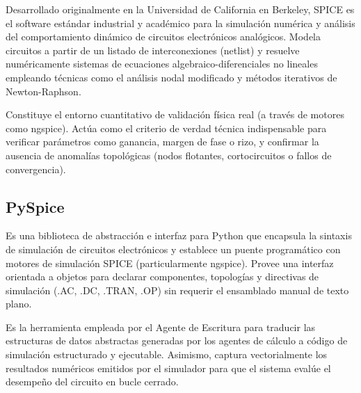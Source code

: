 Desarrollado originalmente en la Universidad de California en Berkeley, SPICE es el software estándar industrial y académico para la simulación numérica y análisis del comportamiento dinámico de circuitos electrónicos analógicos. Modela circuitos a partir de un listado de interconexiones (netlist) y resuelve numéricamente sistemas de ecuaciones algebraico-diferenciales no lineales empleando técnicas como el análisis nodal modificado y métodos iterativos de Newton-Raphson.

Constituye el entorno cuantitativo de validación física real (a través de motores como ngspice). Actúa como el criterio de verdad técnica indispensable para verificar parámetros como ganancia, margen de fase o rizo, y confirmar la ausencia de anomalías topológicas (nodos flotantes, cortocircuitos o fallos de convergencia).   

\subsection{PySpice}

Es una biblioteca de abstracción e interfaz para Python que encapsula la sintaxis de simulación de circuitos electrónicos y establece un puente programático con motores de simulación SPICE (particularmente ngspice). Provee una interfaz orientada a objetos para declarar componentes, topologías y directivas de simulación (.AC, .DC, .TRAN, .OP) sin requerir el ensamblado manual de texto plano.

Es la herramienta empleada por el Agente de Escritura para traducir las estructuras de datos abstractas generadas por los agentes de cálculo a código de simulación estructurado y ejecutable. Asimismo, captura vectorialmente los resultados numéricos emitidos por el simulador para que el sistema evalúe el desempeño del circuito en bucle cerrado.   

